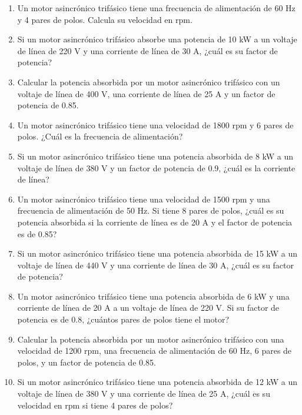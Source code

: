 \documentclass[../main]{subfiles}
\begin{document}
\begin{enumerate}
    \item Un motor asincrónico trifásico tiene una frecuencia de alimentación de 60 Hz y 4 pares de polos. Calcula su velocidad en rpm.
    \item Si un motor asincrónico trifásico absorbe una potencia de 10 kW a un voltaje de línea de 220 V y una corriente de línea de 30 A, ¿cuál es su factor de potencia?
    \item Calcular la potencia absorbida por un motor asincrónico trifásico con un voltaje de línea de 400 V, una corriente de línea de 25 A y un factor de potencia de 0.85.
    \item Un motor asincrónico trifásico tiene una velocidad de 1800 rpm y 6 pares de polos. ¿Cuál es la frecuencia de alimentación?
    \item Si un motor asincrónico trifásico tiene una potencia absorbida de 8 kW a un voltaje de línea de 380 V y un factor de potencia de 0.9, ¿cuál es la corriente de línea?
    \item Un motor asincrónico trifásico tiene una velocidad de 1500 rpm y una frecuencia de alimentación de 50 Hz. Si tiene 8 pares de polos, ¿cuál es su potencia absorbida si la corriente de línea es de 20 A y el factor de potencia es de 0.85?
    \item Si un motor asincrónico trifásico tiene una potencia absorbida de 15 kW a un voltaje de línea de 440 V y una corriente de línea de 30 A, ¿cuál es su factor de potencia?
    \item Un motor asincrónico trifásico tiene una potencia absorbida de 6 kW y una corriente de línea de 20 A a un voltaje de línea de 220 V. Si su factor de potencia es de 0.8, ¿cuántos pares de polos tiene el motor?
    \item Calcular la potencia absorbida por un motor asincrónico trifásico con una velocidad de 1200 rpm, una frecuencia de alimentación de 60 Hz, 6 pares de polos, y un factor de potencia de 0.85.
    \item Si un motor asincrónico trifásico tiene una potencia absorbida de 12 kW a un voltaje de línea de 380 V y una corriente de línea de 25 A, ¿cuál es su velocidad en rpm si tiene 4 pares de polos?
\end{enumerate}
\end{document}
